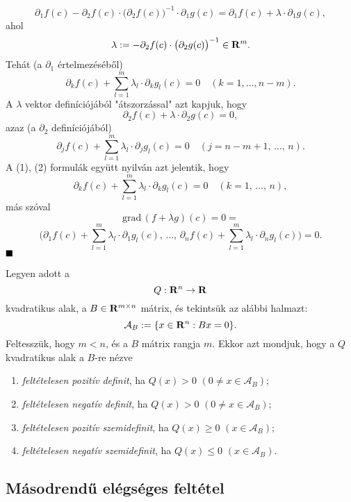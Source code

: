 \[
	\partial_1f(c) - \partial_2f(c) \cdot \big( \partial_2 f(c) \big)^{-1} \cdot \partial_1g(c) = \partial_1f(c) + \lambda \cdot \partial_1g(c),
\]
ahol
\[
	\lambda := -\partial_2f(c) \cdot \big( \partial_2g(c) \big)^{-1} \in \mathbf{R}^m.
\]
Tehát (a $\partial_1$ értelmezéséből)
\begin{equation}
	\partial_k f(c) + \sum_{l=1}^{m} \lambda_l \cdot \partial_k g_l(c) = 0 \quad (k = 1, \dots, n - m).
	\label{eq:eq1}
\end{equation}
A $\lambda$ vektor definíciójából "átszorzással" azt kapjuk, hogy
\[
	\partial_2f(c) + \lambda \cdot \partial_2 g(c) = 0,
\]
azaz (a $\partial_2$ definíciójából)
\begin{equation}
	\partial_jf(c) + \sum_{l=1}^m \lambda_l \cdot \partial_j g_l(c) = 0 \quad (j = n-m+1, \, \dots, \, n).
	\label{eq:eq2}
\end{equation}
A (1), (2) formulák együtt nyilván azt jelentik, hogy
\[
	\partial_kf(c) + \sum_{l=1}^m \lambda_l \cdot \partial_k g_l(c) = 0 \quad (k = 1, \, \dots, \, n),
\]
más szóval
\[
	\text{grad} \, (f + \lambda g)(c) = 0 =
\]
\[
	\Big( \partial_1f(c) + \sum_{l=1}^m \lambda_l \cdot \partial_1 g_l(c), \, \dots, \, \partial_nf(c) + \sum_{l=1}^m \lambda_l \cdot \partial_n g_l(c) \Big) = 0. 
\]
$\hfill \blacksquare$

Legyen adott a
\[
	Q : \mathbf{R}^n \to \mathbf{R}
\]
kvadratikus alak, a $B \in \mathbf{R}^{m \times n}$ mátrix, és tekintsük az alábbi halmazt:
\[
	\mathcal{A}_B := \{ x \in \mathbf{R}^n : Bx = 0 \}.
\]
Feltesszük, hogy $m < n$, és a $B$ mátrix rangja $m$. Ekkor azt mondjuk, hogy a $Q$ kvadratikus alak a $B$-re nézve
\begin{enumerate}
	\item \textit{feltételesen pozitív definit}, ha $Q(x) > 0$ $(0 \neq x \in \mathcal{A}_B)$;
	\item \textit{feltételesen negatív definit}, ha $Q(x) > 0$ $(0 \neq x \in \mathcal{A}_B)$;
	\item \textit{feltételesen pozitív szemidefinit}, ha $Q(x) \geq 0$ $(x \in \mathcal{A}_B)$;
	\item \textit{feltételesen negatív szemidefinit}, ha $Q(x) \leq 0$ $(x \in \mathcal{A}_B)$.
\end{enumerate}

\subsection{Másodrendű elégséges feltétel}

